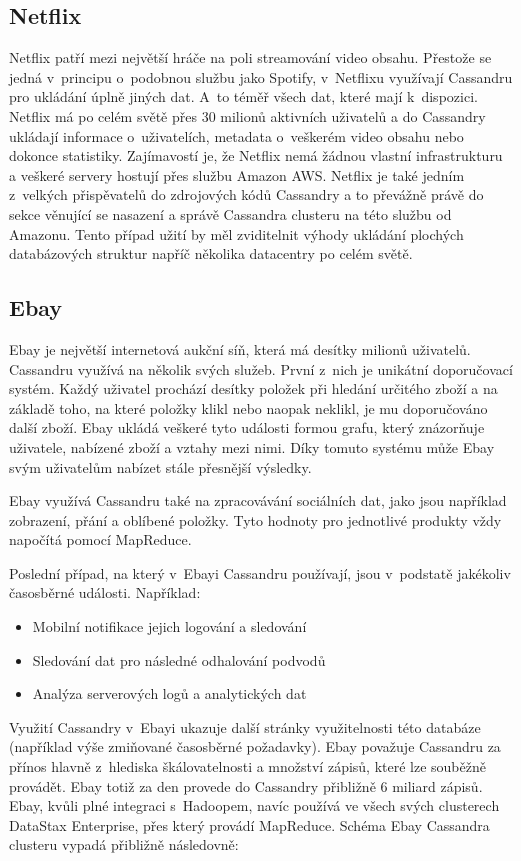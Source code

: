 \subsection{Netflix}
Netflix patří mezi největší hráče na poli streamování video obsahu. Přestože se jedná v~principu o~podobnou službu jako Spotify, v~Netflixu využívají Cassandru pro ukládání úplně jiných dat. A~to téměř všech dat, které mají k~dispozici. Netflix má po celém světě přes 30 milionů aktivních uživatelů a do Cassandry ukládají informace o~uživatelích, metadata o~veškerém video obsahu nebo dokonce statistiky. Zajímavostí je, že Netflix nemá žádnou vlastní infrastrukturu a veškeré servery hostují přes službu Amazon AWS. Netflix je také jedním z~velkých přispěvatelů do zdrojových kódů Cassandry a to převážně právě do sekce věnující se nasazení a správě Cassandra clusteru na této službu od Amazonu. Tento případ užití by měl zviditelnit výhody ukládání plochých databázových struktur napříč několika datacentry po celém světě. 

\subsection{Ebay} 
Ebay je největší internetová aukční síň, která má desítky milionů uživatelů. Cassandru využívá na několik svých služeb. První z~nich je unikátní doporučovací systém. Každý uživatel prochází desítky položek při hledání určitého zboží a na základě toho, na které položky klikl nebo naopak neklikl, je mu doporučováno další zboží. Ebay ukládá veškeré tyto události formou grafu, který znázorňuje uživatele, nabízené zboží a vztahy mezi nimi. Díky tomuto systému může Ebay svým uživatelům nabízet stále přesnější výsledky. 

Ebay využívá Cassandru také na zpracovávání sociálních dat, jako jsou například zobrazení, přání a oblíbené položky. Tyto hodnoty pro jednotlivé produkty vždy napočítá pomocí MapReduce. 

Poslední případ, na který v~Ebayi Cassandru používají, jsou v~podstatě jakékoliv časosběrné události. Například:
\begin{itemize}
\item Mobilní notifikace jejich logování a sledování
\item Sledování dat pro následné odhalování podvodů
\item Analýza serverových logů a analytických dat
\end{itemize}

Využití Cassandry v~Ebayi ukazuje další stránky využitelnosti této databáze (například výše zmiňované časosběrné požadavky). Ebay považuje Cassandru za přínos hlavně z~hlediska škálovatelnosti a množství zápisů, které lze souběžně provádět. Ebay totiž za den provede do Cassandry přibližně 6 miliard zápisů.\cite{ebay} Ebay, kvůli plné integraci s~Hadoopem, navíc používá ve všech svých clusterech DataStax Enterprise, přes který provádí MapReduce. Schéma Ebay Cassandra clusteru vypadá přibližně následovně:

